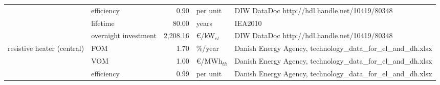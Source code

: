 \begin{longtable}{p{4cm}p{4cm}rp{3cm}p{10cm}}
                      & efficiency &         0.90 &                      per unit &                                                                                                                                                                                                                                                                                        DIW DataDoc http://hdl.handle.net/10419/80348 \\
                      & lifetime &        80.00 &                         years &                                                                                                                                                                                                                                                                                                                              IEA2010 \\
                      & overnight investment &     2,208.16 &               \euro/kW$_{el}$ &                                                                                                                                                                                                                                                                                        DIW DataDoc http://hdl.handle.net/10419/80348 \\
resistive heater (central) & FOM &         1.70 &                       \%/year &                                                                                                                                                                                                                                                                        Danish Energy Agency, technology\_data\_for\_el\_and\_dh.xlsx \\
                      & VOM &         1.00 &              \euro/MWh$_{th}$ &                                                                                                                                                                                                                                                                        Danish Energy Agency, technology\_data\_for\_el\_and\_dh.xlsx \\
                      & efficiency &         0.99 &                      per unit &                                                                                                                                                                                                                                                                        Danish Energy Agency, technology\_data\_for\_el\_and\_dh.xlsx \\

\end{longtable}
